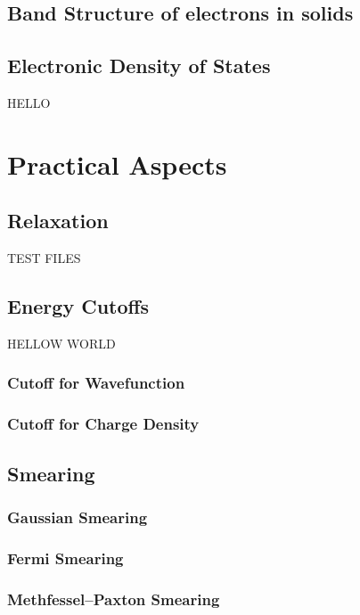     \subsection{Band Structure of electrons in solids}
    \subsection{Electronic Density of States}

    HELLO
\section{Practical Aspects}
    \subsection{Relaxation}
    TEST FILES
    \subsection{Energy Cutoffs}
    HELLOW WORLD
        \subsubsection{Cutoff for Wavefunction}
        \subsubsection{Cutoff for Charge Density}
    \subsection{Smearing}
        \subsubsection{Gaussian Smearing}
        \subsubsection{Fermi Smearing}
        \subsubsection{Methfessel–Paxton Smearing}





